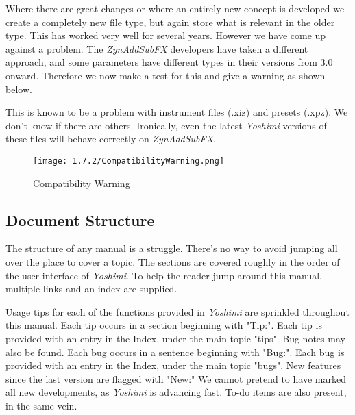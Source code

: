 \documentclass[
 11pt,
 twoside,
 a4paper,
 final                                 %
]{article}
\begin{document}
   Where there are great changes or where an entirely new concept is
   developed we create a completely new file type, but again store what is
   relevant in the older type.
   This has worked very well for several years. However we have come up
   against a problem. The \textsl{ZynAddSubFX} developers have taken a
   different approach, and some parameters have different types in their
   versions from 3.0 onward. Therefore we now make a test for this and give
   a warning as shown below.


   This is known to be a problem with instrument files (.xiz) and presets
   (.xpz). We don't know if there are others. Ironically, even the latest
   \textsl{Yoshimi} versions of these files will behave correctly on
   \textsl{ZynAddSubFX}.

\begin{figure}[H]
   \centering
   \texttt{[image: 1.7.2/CompatibilityWarning.png]}
   \caption{Compatibility Warning}
   \label{fig:compatibiilty_warning}
\end{figure}


\subsection{Document Structure}
\label{subsec:introduction_document_structure}

   The structure of any manual is a struggle.
   There's no way to avoid jumping all over the place to
   cover a topic.  The sections are covered roughly
   in the order of the user interface of
   \textsl{Yoshimi}.  To help the reader jump around this manual, multiple
   links and an index are supplied.

   Usage tips
   for each of the functions provided in
   \textsl{Yoshimi} are sprinkled throughout this manual.
   Each tip occurs in a section beginning with "Tip:".
   Each tip is provided with an entry in the Index, under the
   main topic "tips".
   Bug notes may also be found.
   Each bug occurs in a sentence beginning with "Bug:".  Each bug is
   provided with an entry in the Index, under the main topic "bugs".
   New features
   since the last version are flagged with "New:"  We cannot pretend to have
   marked all new developments, as \textsl{Yoshimi} is advancing fast.
   To-do items are also present, in the same vein.
\end{document}
